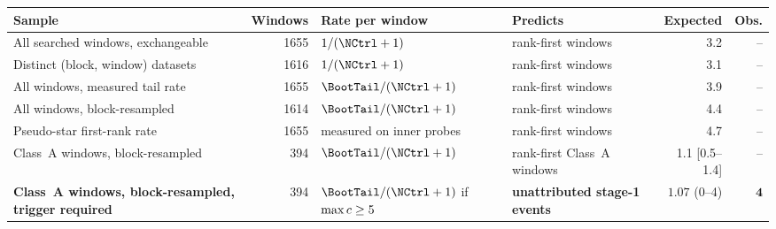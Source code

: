 \begin{tabular}{@{}p{}rp{}p{}rr@{}}
\toprule
Sample & Windows & Rate per window & Predicts & Expected & Obs. \\
\midrule
All searched windows, exchangeable & 1655 & $1/(\NCtrl+1)$ & rank-first windows & 3.2 & -- \\
Distinct (block, window) datasets & 1616 & $1/(\NCtrl+1)$ & rank-first windows & 3.1 & -- \\
All windows, measured tail rate & 1655 & $\BootTail/(\NCtrl+1)$ & rank-first windows & 3.9 & -- \\
All windows, block-resampled & 1614 & $\BootTail/(\NCtrl+1)$ & rank-first windows & 4.4 & -- \\
Pseudo-star first-rank rate & 1655 & measured on inner probes & rank-first windows & 4.7 & -- \\
Class~A windows, block-resampled & 394 & $\BootTail/(\NCtrl+1)$ & rank-first Class~A windows & 1.1 [0.5--1.4] & -- \\
\textbf{Class~A windows, block-resampled, trigger required} & 394 & $\BootTail/(\NCtrl+1)$ if $\max c\geq5$ & \textbf{unattributed stage-1 events} & $\mathbf{1.07}$ (0--4) & $\mathbf{4}$ \\
\bottomrule
\end{tabular}
